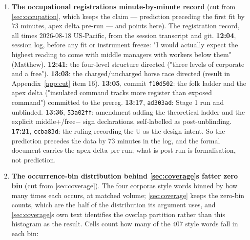 \begin{enumerate}
  Clustering the standard errors by member --- the study\textquotesingle s third encounter with
  unclustered inference flattering a result --- leaves the provincial point
  estimates untouched and doubles to triples their errors: class II falls from
  t = 3.40 to 1.48, IVab from 3.51 to 1.49, VIIab from \(-4.04\) to \(-1.84\), the
  education ladder from 2.96 to 0.78. Member-years are not independent draws,
  and treating them as such had manufactured the significance.
\item
  \textbf{The occupational registration\textquotesingle s minute-by-minute record} (cut from
  \cref{sec:occupation}, which keeps the claim --- prediction preceding the first fit by 73
  minutes, apex delta pre-run --- and points here). The registration record,
  all times 2026-08-18 US-Pacific, from the session transcript and git.
  \textbf{12:04}, session log, before any fit or instrument freeze: "I would
  actually expect the highest reading to come with middle managers with
  workers below them" (Matthew). \textbf{12:41}: the four-level structure directed
  ("three levels of corporate and a free"). \textbf{13:03}: the charged/uncharged
  horse race directed (result in Appendix~\ref{app:cut} item 16). \textbf{13:05}, commit
  \texttt{f10d502}: the folk ladder and the apex delta ("insulated command tracks
  more register than exposed command") committed to the prereg. \textbf{13:17},
  \texttt{ad303ad}: Stage 1 run and unblinded. \textbf{13:36}, \texttt{53a02ff}: amendment
  adding the theoretical ladder and the explicit middle+/free\(-\) sign
  declarations, self-labelled as post-unblinding. \textbf{17:21}, \texttt{ccba83d}: the
  ruling recording the U as the design intent. So the prediction precedes the
  data by 73 minutes in the log, and the formal document carries the apex
  delta pre-run; what is post-run is formalisation, not prediction.
\item
  \textbf{The occurrence-bin distribution behind \cref{sec:coverage}\textquotesingle s fatter zero bin} (cut
  from \cref{sec:coverage}). The four corpora\textquotesingle s style words binned by how many times each
  occurs, at matched volume; \cref{sec:coverage} keeps the zero-bin counts, which are the
  half of the distribution its argument uses, and \cref{sec:coverage}\textquotesingle s own text identifies
  the overlap partition rather than this histogram as the result. Cells count
  how many of the 407 style words fall in each bin:


\end{enumerate}
